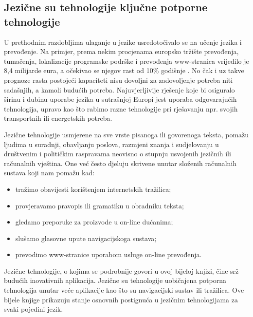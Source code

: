 \begin{multicols}{2}

\subsection{Jezične su tehnologije ključne potporne tehnologije}

U prethodnim razdobljima ulaganje u jezike usredotočivalo se na učenje jezika i prevođenje. Na primjer, prema nekim procjenama europsko tržište prevođenja, tumačenja, lokalizacije programske podrške i prevođenja www-stranica vrijedilo je 8,4 milijarde eura, a očekivao se njegov rast od 10\% godišnje \cite{str5}. No čak i uz takve prognoze rasta postojeći kapaciteti nisu dovoljni za zadovoljenje potreba niti sadašnjih, a kamoli budućih potreba. Najuvjerljivije rješenje koje bi osiguralo širinu i dubinu uporabe jezika u sutrašnjoj Europi jest uporaba odgovarajućih tehnologija, upravo kao što rabimo razne tehnologije pri rješavanju npr. svojih transportnih ili energetskih potreba.

Jezične tehnologije usmjerene na sve vrste pisanoga ili govorenoga teksta, pomažu ljudima u suradnji, obavljanju poslova, razmjeni znanja i sudjelovanju u društvenim i političkim raspravama neovisno o stupnju usvojenih jezičnih ili računalnih vještina. One već često djeluju skrivene unutar složenih računalnih sustava koji nam pomažu kad:

\begin{itemize}
\item tražimo obavijesti korištenjem internetskih tražilica;
\item provjeravamo pravopis ili gramatiku u obradniku teksta;
\item gledamo preporuke za proizvode u on-line dućanima;
\item slušamo glasovne upute navigacijskoga sustava;
\item prevodimo www-stranice uporabom usluge on-line prevođenja.
\end{itemize}

Jezične tehnologije, o kojima se podrobnije govori u ovoj bijeloj knjizi, čine srž budućih inovativnih aplikacija. Jezične su tehnologije uobičajena potporna tehnologija unutar veće aplikacije kao što su navigacijski sustav ili tražilica. Ove bijele knjige prikazuju stanje osnovnih postignuća u jezičnim tehnologijama za svaki pojedini jezik.



\end{multicols}
